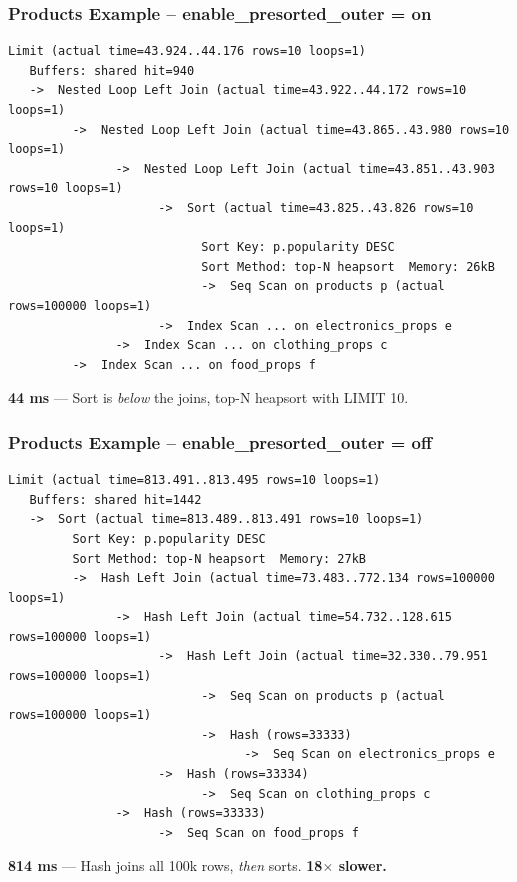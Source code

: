 \documentclass{beamer}
\begin{document}
\begin{frame}[fragile]\frametitle{Products Example -- enable\_presorted\_outer = on}
\begin{lstlisting}[basicstyle=\tiny]
 Limit (actual time=43.924..44.176 rows=10 loops=1)
   Buffers: shared hit=940
   ->  Nested Loop Left Join (actual time=43.922..44.172 rows=10 loops=1)
         ->  Nested Loop Left Join (actual time=43.865..43.980 rows=10 loops=1)
               ->  Nested Loop Left Join (actual time=43.851..43.903 rows=10 loops=1)
                     ->  Sort (actual time=43.825..43.826 rows=10 loops=1)
                           Sort Key: p.popularity DESC
                           Sort Method: top-N heapsort  Memory: 26kB
                           ->  Seq Scan on products p (actual rows=100000 loops=1)
                     ->  Index Scan ... on electronics_props e
               ->  Index Scan ... on clothing_props c
         ->  Index Scan ... on food_props f
\end{lstlisting}
\begin{center}
\textbf{44 ms} --- Sort is \textit{below} the joins, top-N heapsort with LIMIT 10.
\end{center}
\end{frame}

\begin{frame}[fragile]\frametitle{Products Example -- enable\_presorted\_outer = off}
\begin{lstlisting}[basicstyle=\tiny]
 Limit (actual time=813.491..813.495 rows=10 loops=1)
   Buffers: shared hit=1442
   ->  Sort (actual time=813.489..813.491 rows=10 loops=1)
         Sort Key: p.popularity DESC
         Sort Method: top-N heapsort  Memory: 27kB
         ->  Hash Left Join (actual time=73.483..772.134 rows=100000 loops=1)
               ->  Hash Left Join (actual time=54.732..128.615 rows=100000 loops=1)
                     ->  Hash Left Join (actual time=32.330..79.951 rows=100000 loops=1)
                           ->  Seq Scan on products p (actual rows=100000 loops=1)
                           ->  Hash (rows=33333)
                                 ->  Seq Scan on electronics_props e
                     ->  Hash (rows=33334)
                           ->  Seq Scan on clothing_props c
               ->  Hash (rows=33333)
                     ->  Seq Scan on food_props f
\end{lstlisting}
\begin{center}
\textbf{814 ms} --- Hash joins all 100k rows, \textit{then} sorts. \textbf{18$\times$ slower.}
\end{center}
\end{frame}
\end{document}
